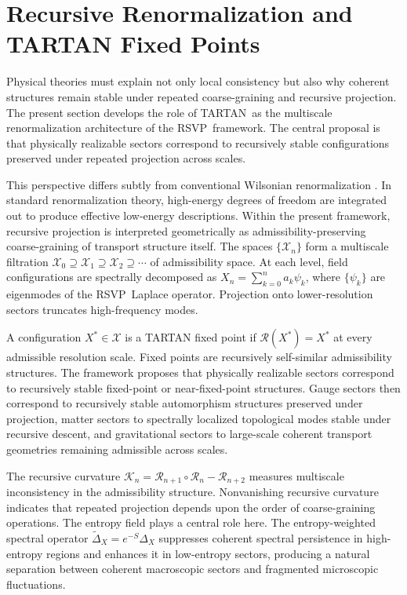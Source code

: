 \documentclass[12pt,a4paper]{article}
\newcommand{\RSVP}{\textrm{RSVP}}
\newcommand{\TARTAN}{\textrm{TARTAN}}
\begin{document}
\section{Recursive Renormalization and TARTAN Fixed Points}

Physical theories must explain not only local consistency but also why coherent
structures remain stable under repeated coarse-graining and recursive
projection. The present section develops the role of \TARTAN\ as the multiscale
renormalization architecture of the \RSVP\ framework. The central proposal is
that physically realizable sectors correspond to recursively stable configurations
preserved under repeated projection across scales.

This perspective differs subtly from conventional Wilsonian renormalization
\cite{Wilson1975}. In standard renormalization theory, high-energy degrees of
freedom are integrated out to produce effective low-energy descriptions. Within
the present framework, recursive projection is interpreted geometrically as
admissibility-preserving coarse-graining of transport structure itself. The
spaces $\{\mathcal{X}_n\}$ form a multiscale filtration
$\mathcal{X}_0\supseteq\mathcal{X}_1\supseteq\mathcal{X}_2\supseteq\cdots$
of admissibility space. At each level, field configurations are spectrally
decomposed as $X_n=\sum_{k=0}^n a_k\psi_k$, where $\{\psi_k\}$ are eigenmodes
of the \RSVP\ Laplace operator. Projection onto lower-resolution sectors
truncates high-frequency modes.

A configuration $X^\ast\in\mathcal{X}$ is a TARTAN fixed point if
$\mathcal{R}(X^\ast)=X^\ast$ at every admissible resolution scale. Fixed points
are recursively self-similar admissibility structures. The framework proposes
that physically realizable sectors correspond to recursively stable fixed-point
or near-fixed-point structures. Gauge sectors then correspond to recursively
stable automorphism structures preserved under projection, matter sectors to
spectrally localized topological modes stable under recursive descent, and
gravitational sectors to large-scale coherent transport geometries remaining
admissible across scales.

The recursive curvature $\mathcal{K}_n=\mathcal{R}_{n+1}\circ\mathcal{R}_n-\mathcal{R}_{n+2}$
measures multiscale inconsistency in the admissibility structure. Nonvanishing
recursive curvature indicates that repeated projection depends upon the order of
coarse-graining operations. The entropy field plays a central role here. The
entropy-weighted spectral operator $\widetilde{\Delta}_X=e^{-S}\Delta_X$
suppresses coherent spectral persistence in high-entropy regions and enhances
it in low-entropy sectors, producing a natural separation between coherent
macroscopic sectors and fragmented microscopic fluctuations.
\end{document}
